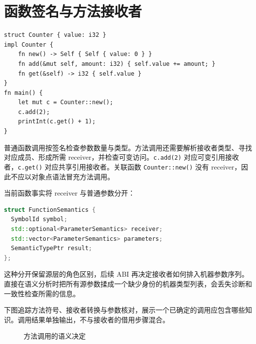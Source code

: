 \section{函数签名与方法接收者}
\begin{lstlisting}[language=Rustless]
struct Counter { value: i32 }
impl Counter {
    fn new() -> Self { Self { value: 0 } }
    fn add(&mut self, amount: i32) { self.value += amount; }
    fn get(&self) -> i32 { self.value }
}
fn main() {
    let mut c = Counter::new();
    c.add(2);
    printInt(c.get() + 1);
}
\end{lstlisting}
普通函数调用按签名检查参数数量与类型。方法调用还需要解析接收者类型、寻找对应成员、形成所需 receiver，并检查可变访问。\lstinline[language=Rustless]|c.add(2)| 对应可变引用接收者，\lstinline[language=Rustless]|c.get()| 对应共享引用接收者。关联函数 \lstinline[language=Rustless]|Counter::new()| 没有 receiver，因此不应以对象点语法冒充方法调用。

当前函数事实将 receiver 与普通参数分开：
\begin{lstlisting}[language=C++]
struct FunctionSemantics {
  SymbolId symbol;
  std::optional<ParameterSemantics> receiver;
  std::vector<ParameterSemantics> parameters;
  SemanticTypePtr result;
};
\end{lstlisting}
这种分开保留源层的角色区别，后续 ABI 再决定接收者如何排入机器参数序列。直接在语义分析时把所有源参数揉成一个缺少身份的机器类型列表，会丢失诊断和一致性检查所需的信息。

下图追踪方法符号、接收者转换与参数核对，展示一个已确定的调用应包含哪些知识。调用结果单独输出，不与接收者的借用步骤混合。
\begin{figure}[htbp]
\centering
{}
\caption{方法调用的语义决定}
\end{figure}

